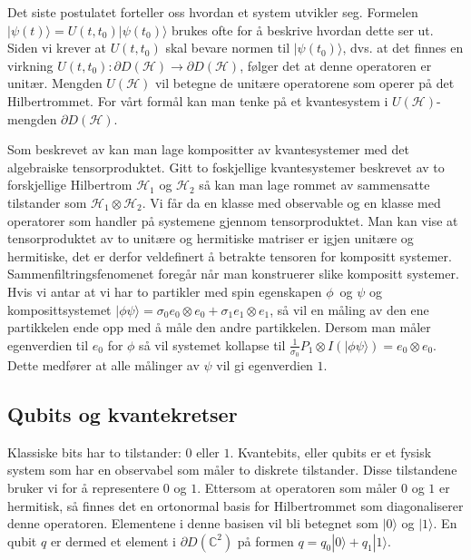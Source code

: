         Det siste postulatet forteller oss hvordan et system utvikler seg. Formelen $|\psi (t)\rangle = U(t,t_0)|\psi (t_0)\rangle$ brukes ofte for å beskrive hvordan dette ser ut. Siden vi krever at $U(t,t_0)$ skal bevare normen til $|\psi (t_0)\rangle$, dvs. at det finnes en virkning $U(t,t_0):\partial D(\mathcal{H})\rightarrow\partial D(\mathcal{H})$, følger det at denne operatoren er unitær. Mengden $U(\mathcal{H})$ vil betegne de unitære operatorene som operer på det Hilbertrommet. For vårt formål kan man tenke på et kvantesystem i $U(\mathcal{H})$-mengden $\partial D(\mathcal{H})$.

        Som beskrevet av \cite{portugal_2019} kan man lage kompositter av kvantesystemer med det algebraiske tensorproduktet. Gitt to foskjellige kvantesystemer beskrevet av to forskjellige Hilbertrom $\mathcal{H}_1$ og $\mathcal{H}_2$ så kan man lage rommet av sammensatte tilstander som $\mathcal{H}_1\otimes\mathcal{H}_2$. Vi får da en klasse med observable og en klasse med operatorer som handler på systemene gjennom tensorproduktet. Man kan vise at tensorproduktet av to unitære og hermitiske matriser er igjen unitære og hermitiske, det er derfor veldefinert å betrakte tensoren for kompositt systemer. Sammenfiltringsfenomenet foregår når man konstruerer slike kompositt systemer. Hvis vi antar at vi har to partikler med spin egenskapen $\phi$ og $\psi$ og komposittsystemet $|\phi\psi\rangle = \sigma_0e_0\otimes e_0 + \sigma_1e_1\otimes e_1$, så vil en måling av den ene partikkelen ende opp med å måle den andre partikkelen. Dersom man måler egenverdien til $e_0$ for $\phi$ så vil systemet kollapse til $\frac{1}{\sigma_0}P_1\otimes I(|\phi\psi\rangle) = e_0\otimes e_0$. Dette medfører at alle målinger av $\psi$ vil gi egenverdien $1$.

\subsection{Qubits og kvantekretser}
    
        Klassiske bits har to tilstander: $0$ eller $1$. Kvantebits, eller qubits er et fysisk system som har en observabel som måler to diskrete tilstander. Disse tilstandene bruker vi for å representere $0$ og $1$. Ettersom at operatoren som måler $0$ og $1$ er hermitisk, så finnes det en ortonormal basis for Hilbertrommet som diagonaliserer denne operatoren. Elementene i denne basisen vil bli betegnet som $|0\rangle$ og $|1\rangle$. En qubit $q$ er dermed et element i $\partial D(\mathbb{C}^2)$ på formen $q = q_0|0\rangle + q_1|1\rangle$. 

